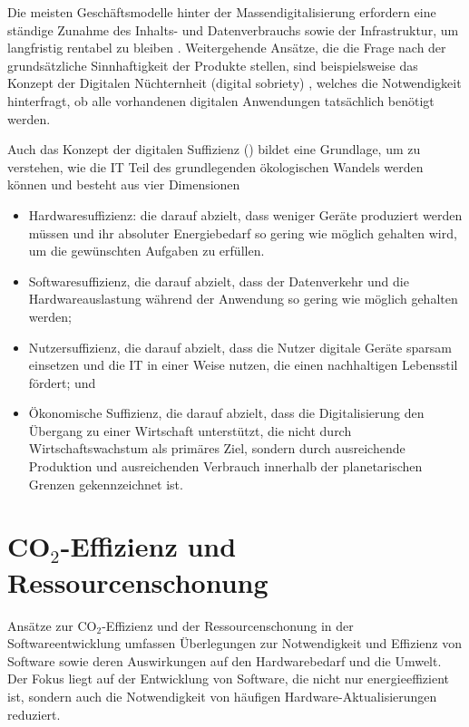 \documentclass{article}
\begin{document}
Die meisten Geschäftsmodelle hinter der Massendigitalisierung erfordern eine ständige Zunahme des Inhalts- und Datenverbrauchs sowie der
Infrastruktur, um langfristig rentabel zu bleiben \cite{brouillard_deploying_2021}. 
 Weitergehende  Ansätze, die die Frage nach der grundsätzliche Sinnhaftigkeit der Produkte stellen, sind beispielsweise das Konzept der \glqq Digitalen Nüchternheit\grqq{} (digital sobriety) \cite{project_shift_2019,brouillard_deploying_2021}, welches die Notwendigkeit hinterfragt, ob alle vorhandenen digitalen Anwendungen tatsächlich benötigt werden. 

Auch das Konzept der digitalen Suffizienz (\cite{santarius_digital_2023}) bildet eine Grundlage, um zu verstehen, wie die IT Teil des grundlegenden ökologischen Wandels werden können und besteht aus vier Dimensionen 
\begin{itemize}
	\item Hardwaresuffizienz: die darauf abzielt, dass weniger Geräte produziert werden müssen und ihr absoluter Energiebedarf so gering wie möglich gehalten wird, um die gewünschten Aufgaben zu erfüllen.
  \item  Softwaresuffizienz, die darauf abzielt, dass der Datenverkehr und die Hardwareauslastung während der Anwendung so gering wie möglich gehalten werden; 
 \item Nutzersuffizienz, die darauf abzielt, dass die Nutzer digitale Geräte sparsam einsetzen und die IT in einer Weise nutzen, die einen nachhaltigen Lebensstil fördert; und 
\item Ökonomische Suffizienz, die darauf abzielt, dass die Digitalisierung den Übergang zu einer Wirtschaft unterstützt, die nicht durch Wirtschaftswachstum als primäres Ziel, sondern durch ausreichende Produktion und ausreichenden Verbrauch innerhalb der planetarischen Grenzen gekennzeichnet ist. 
\end{itemize}




\section{CO$_2$-Effizienz und Ressourcenschonung}

Ansätze zur CO$_2$-Effizienz und der Ressourcenschonung in der Softwareentwicklung umfassen Überlegungen zur Notwendigkeit und Effizienz von Software sowie deren Auswirkungen auf den Hardwarebedarf und die Umwelt. Der Fokus liegt auf der Entwicklung von Software, die nicht nur energieeffizient ist, sondern auch die Notwendigkeit von häufigen Hardware-Aktualisierungen reduziert.
\end{document}

